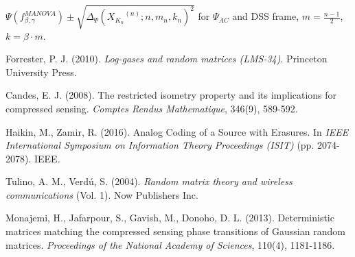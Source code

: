 \documentclass[a4paper,12pt]{article}
\newcommand{\m}{m}
\newcommand{\specstat}{\ensuremath{\Psi}}
\newcommand{\Xkn}{\ensuremath{X_{K_n}}}
\begin{document}
\begin{table}
		\centering

\caption{$\Psi(f^{MANOVA}_{\beta,\gamma})\pm\sqrt{\Delta_\specstat(\Xkn^{(n)};n,\m_n,k_n)^2}$ for $\specstat_{AC}$ and DSS frame, $m=\frac{n-1}{2}$, $k=\beta\cdot\m$.
  }
		\label{TabulateAccuracy}
	\end{table}




\clearpage
\begin{thebibliography}{1}
        
 Forrester, P. J. (2010).  \emph{Log-gases and random matrices (LMS-34)}. Princeton University Press.


 Candes, E. J. (2008). The restricted isometry property and its implications for compressed sensing. \emph{Comptes Rendus Mathematique}, 346(9), 589-592.


 Haikin, M., Zamir, R. (2016). Analog Coding of a Source with Erasures. In \emph{IEEE International Symposium on Information Theory Proceedings (ISIT)} (pp. 2074-2078). IEEE.


 Tulino, A. M., Verd{\'u}, S. (2004). \emph{Random matrix theory and wireless communications} (Vol. 1). Now Publishers Inc.


 Monajemi, H., Jafarpour, S., Gavish, M., Donoho, D. L. (2013). Deterministic matrices matching the compressed sensing phase transitions of Gaussian random matrices. \emph{Proceedings of the National Academy of Sciences}, 110(4), 1181-1186.


\end{thebibliography}
\end{document}
